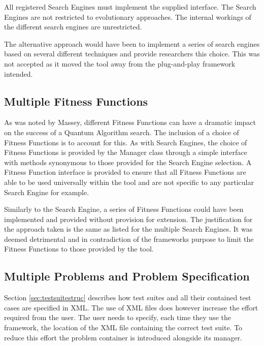 All registered Search Engines must implement the supplied interface.
The Search Engines are not restricted to evolutionary approaches.
The internal workings of the different search engines are unrestricted.

The alternative approach would have been to implement a series of search engines based on several different techniques and provide researchers this choice.
This was not accepted as it moved the tool away from the plug-and-play framework intended.

\subsection{Multiple Fitness Functions}
\label{sec:mulsuitmeas}
As was noted by Massey\cite{masseythesis}, different Fitness Functions can have a dramatic impact on the success of a Quantum Algorithm search.
The inclusion of a choice of Fitness Functions is to account for this.
As with Search Engines, the choice of Fitness Functions is provided by the Manager class through a simple interface with methods synonymous to those provided for the Search Engine selection.
A Fitness Function interface is provided to ensure that all Fitness Functions are able to be used universally within the tool and are not specific to any particular Search Engine for example.

Similarly to the Search Engine, a series of Fitness Functions could have been implemented and provided without provision for extension.
The justification for the approach taken is the same as listed for the multiple Search Engines.
It was deemed detrimental and in contradiction of the frameworks purpose to limit the Fitness Functions to those provided by the tool.


\subsection{Multiple Problems and Problem Specification}
\label{sec:problemman}

Section \ref{sec:testsuitestruc} describes how test suites and all their contained test cases are specified in XML.
The use of XML files does however increase the effort required from the user.
The user needs to specify, each time they use the framework, the location of the XML file containing the correct test suite.
To reduce this effort the problem container is introduced alongside its manager.

